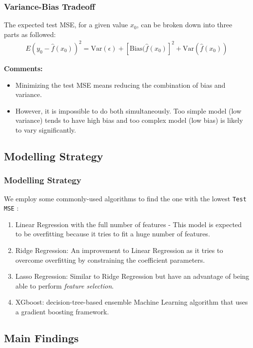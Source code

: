 \documentclass{beamer}
\begin{document}
\begin{frame}
  \frametitle{Variance-Bias Tradeoff}

The expected test MSE, for a given value $x_0$, can be broken down into three
parts as followed:
  \begin{eqnarray}
  E(y_0 - \hat{f}(x_{0}))^2 =  \textrm{Var}(\epsilon) +
  [\textrm{Bias}(\hat{f}(x_{0})]^2 + \textrm{Var}(\hat{f}(x_{0}))
  \label{eqn:variance-bias-tradeoff}
  \end{eqnarray}

\textbf{Comments:}
\begin{itemize}
  \item Minimizing the test MSE means reducing the combination of bias and variance.
  \item However, it is impossible to do both simultaneously. Too simple model
    (low variance) tends to have high bias and too complex model (low bias) is likely to vary significantly.
\end{itemize}
\end{frame}

\subsection{Modelling Strategy}

\begin{frame}
  \frametitle{Modelling Strategy}
We employ some commonly-used algorithms to find the one with the lowest
  \texttt{Test MSE} :
  \begin{enumerate}
    \item Linear Regression with the full number of features - This model is
      expected to be overfitting because it tries to fit a huge number of
      features.
    \item Ridge Regression: An improvement to Linear Regression as it tries to
      overcome overfitting by constraining the coefficient parameters.
    \item Lasso Regression: Similar to Ridge Regression but have an advantage of
      being able to perform \textit{feature selection}.
    \item XGboost: decision-tree-based ensemble Machine Learning algorithm
      that uses a gradient boosting framework.

  \end{enumerate}
\end{frame}



\subsection{Main Findings}
\end{document}
